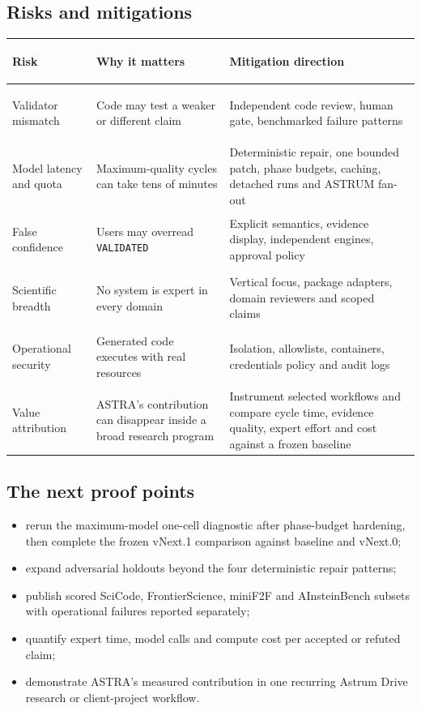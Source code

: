 \documentclass[10pt,a4paper]{article}
\begin{document}
\subsection*{Risks and mitigations}

\begin{riskbox}
\begin{tabularx}{\textwidth}{@{}>{\bfseries\raggedright\arraybackslash}p{3.1cm} Y Y@{}}
Risk & Why it matters & Mitigation direction \\
\midrule
Validator mismatch & Code may test a weaker or different claim & Independent code review, human gate, benchmarked failure patterns \\
Model latency and quota & Maximum-quality cycles can take tens of minutes & Deterministic repair, one bounded patch, phase budgets, caching, detached runs and ASTRUM fan-out \\
False confidence & Users may overread \texttt{VALIDATED} & Explicit semantics, evidence display, independent engines, approval policy \\
Scientific breadth & No system is expert in every domain & Vertical focus, package adapters, domain reviewers and scoped claims \\
Operational security & Generated code executes with real resources & Isolation, allowlists, containers, credentials policy and audit logs \\
Value attribution & ASTRA's contribution can disappear inside a broad research program & Instrument selected workflows and compare cycle time, evidence quality, expert effort and cost against a frozen baseline \\
\end{tabularx}
\end{riskbox}

\subsection*{The next proof points}

\begin{itemize}
  \item rerun the maximum-model one-cell diagnostic after phase-budget hardening, then
  complete the frozen vNext.1 comparison against baseline and vNext.0;
  \item expand adversarial holdouts beyond the four deterministic repair patterns;
  \item publish scored SciCode, FrontierScience, miniF2F and AInsteinBench subsets
  with operational failures reported separately;
  \item quantify expert time, model calls and compute cost per accepted or refuted claim;
  \item demonstrate ASTRA's measured contribution in one recurring Astrum Drive
  research or client-project workflow.
\end{itemize}
\end{document}
